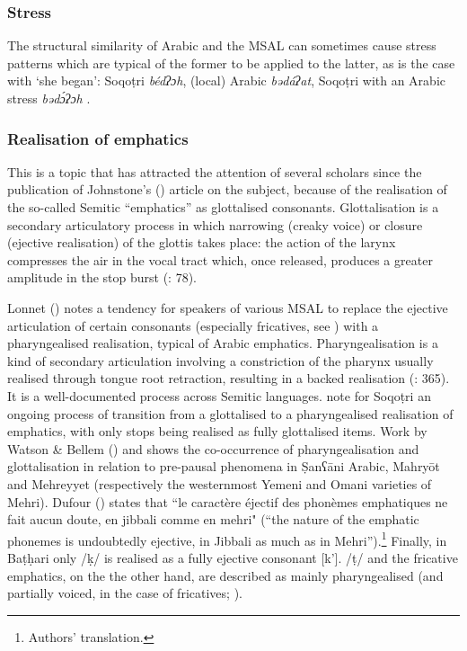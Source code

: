 \documentclass[output=paper]{langsci/langscibook}
\begin{document}
 \subsubsection{Stress}

The structural similarity of Arabic and the MSAL can sometimes cause stress patterns which are typical of the former to be applied to the latter, as is the case with `she began': Soqoṭri \textit{bédʔɔh}, (local) Arabic \textit{bədáʔat}, Soqoṭri with an Arabic stress \textit{bədɔ́ʔɔh} \citep[299]{Lonnet2011}.


 \subsubsection{Realisation of emphatics}\label{sec:key:emph}

This is a topic that has attracted the attention of several scholars since the publication of Johnstone’s (\citeyear{Johnstone1975}) article on the subject, because of the realisation of the so-called Semitic “emphatics” as glottalised consonants. Glottalisation is a secondary articulatory process in which narrowing (creaky voice) or closure (ejective realisation) of the glottis takes place: the action of the larynx compresses the air in the vocal tract which, once released, produces a greater amplitude in the stop burst (\citealt{LadefogedMaddieson1996}: 78). 

Lonnet (\citeyear[299]{Lonnet2011}) notes a tendency for speakers of various MSAL to replace the ejective articulation of certain consonants (especially fricatives, see \citealt{RidouaneGendrot2017}) with a pharyngealised realisation, typical of Arabic emphatics. Pharyngealisation is a kind of secondary articulation involving a constriction of the pharynx usually realised through tongue root retraction, resulting in a backed realisation (\citealt{LadefogedMaddieson1996}: 365). It is a well-documented process across Semitic languages. \citet{NaumkinPorkhomovsky1981} note for Soqoṭri an ongoing process of transition from a glottalised to a pharyngealised realisation of emphatics, with only stops being realised as fully glottalised items. Work by Watson \& Bellem (\citeyear{WatsonBellem2010,WatsonBellem2011}) and \citet{WatsonHeselwood2016} shows the co-occurrence of pharyngealisation and glottalisation in relation to pre-pausal phenomena in \d{S}anʕāni Arabic, Mahryōt and Mehreyyet (respectively the westernmost Yemeni and Omani varieties of Mehri). Dufour (\citeyear[22]{Dufour2016}) states that ``le caractère éjectif des phonèmes emphatiques ne fait aucun doute, en jibbali comme en mehri" (“the nature of the emphatic phonemes is undoubtedly ejective, in Jibbali as much as in Mehri”).\footnote{Authors' translation.} Finally, in Baṭḥari only /ḳ/ is realised as a fully ejective consonant [k’]. /ṭ/ and the fricative emphatics, on the the other hand, are described as mainly pharyngealised (and partially voiced, in the case of fricatives; \citealt{Gasparini2017}).
\end{document}
